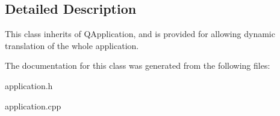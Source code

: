 \subsection{Detailed Description}
This class inherits of QApplication, and is provided for allowing dynamic translation of the whole application. 

The documentation for this class was generated from the following files:\begin{DoxyCompactItemize}
\item 
application.h\item 
application.cpp\end{DoxyCompactItemize}
